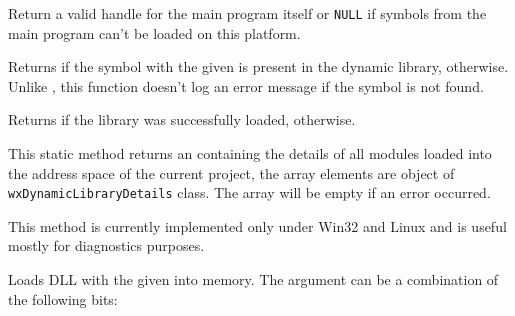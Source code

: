 \label{wxdynamiclibrarygetprogramhandle}


Return a valid handle for the main program itself or \texttt{NULL} if symbols
from the main program can't be loaded on this platform.


\label{wxdynamiclibraryhassymbol}


Returns \true if the symbol with the given  is present in the dynamic
library, \false otherwise. Unlike ,
this function doesn't log an error message if the symbol is not found.



\label{wxdynamiclibraryisloaded}


Returns \true if the library was successfully loaded, \false otherwise.


\label{wxdynamiclibrarylistloaded}


This static method returns an  containing the details
of all modules loaded into the address space of the current project, the array
elements are object of \texttt{wxDynamicLibraryDetails} class. The array will
be empty if an error occurred.

This method is currently implemented only under Win32 and Linux and is useful
mostly for diagnostics purposes.


\label{wxdynamiclibraryload}


Loads DLL with the given  into memory. The  argument can
be a combination of the following bits:

\begin{twocollist}
\end{twocollist}


